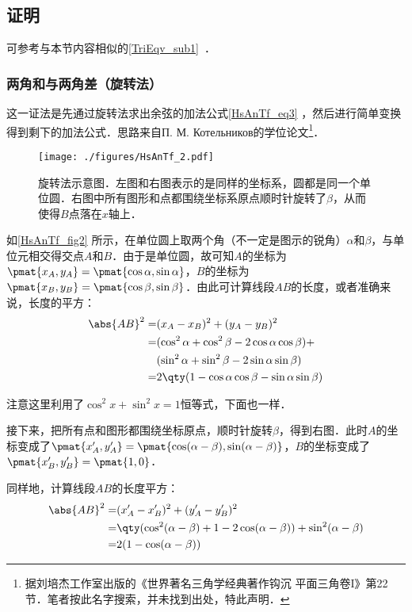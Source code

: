\subsection{证明}

可参考与本节内容相似的\autoref{TriEqv_sub1}~．

\subsubsection{两角和与两角差（旋转法）}

这一证法是先通过旋转法求出余弦的加法公式\autoref{HsAnTf_eq3} ，然后进行简单变换得到剩下的加法公式．思路来自П. М. Котельников的学位论文\footnote{据刘培杰工作室出版的《世界著名三角学经典著作钩沉 平面三角卷I》第22节．笔者按此名字搜索，并未找到出处，特此声明．}．

\begin{figure}[ht]
\centering
\texttt{[image: ./figures/HsAnTf\_2.pdf]}
\caption{旋转法示意图．左图和右图表示的是同样的坐标系，圆都是同一个单位圆．右图中所有图形和点都围绕坐标系原点顺时针旋转了$\beta$，从而使得$B$点落在$x$轴上．} \label{HsAnTf_fig2}
\end{figure}


如\autoref{HsAnTf_fig2} 所示，在单位圆上取两个角（不一定是图示的锐角）$\alpha$和$\beta$，与单位元相交得交点$A$和$B$．由于是单位圆，故可知$A$的坐标为$\pmat{x_A, y_A}=\pmat{\cos\alpha, \sin\alpha}$，$B$的坐标为$\pmat{x_B, y_B}=\pmat{\cos\beta, \sin\beta}$．由此可计算线段$AB$的长度，或者准确来说，长度的平方：
\begin{equation}\label{HsAnTf_eq1}
\begin{aligned}
\abs{AB}^2 =& (x_A-x_B)^2+(y_A-y_B)^2\\
=& (\cos^2\alpha+\cos^2\beta-2\cos\alpha\cos\beta)+\\&(\sin^2\alpha+\sin^2\beta-2\sin\alpha\sin\beta)\\
=& 2\qty(1-\cos\alpha\cos\beta-\sin\alpha\sin\beta)
\end{aligned}
\end{equation}

注意这里利用了$\cos^2x+\sin^2x=1$恒等式，下面也一样．

接下来，把所有点和图形都围绕坐标原点，顺时针旋转$\beta$，得到右图．此时$A$的坐标变成了$\pmat{x'_A, y'_A}=\pmat{\cos(\alpha-\beta), \sin(\alpha-\beta)}$，$B$的坐标变成了$\pmat{x'_B, y'_B}=\pmat{1, 0}$．

同样地，计算线段$AB$的长度平方：
\begin{equation}\label{HsAnTf_eq2}
\begin{aligned}
\abs{AB}^2 =& (x'_A-x'_B)^2+(y'_A-y'_B)^2\\
=& \qty(\cos^2(\alpha-\beta)+1-2\cos(\alpha-\beta))+\sin^2(\alpha-\beta)\\
=& 2(1-\cos(\alpha-\beta))
\end{aligned}
\end{equation}

